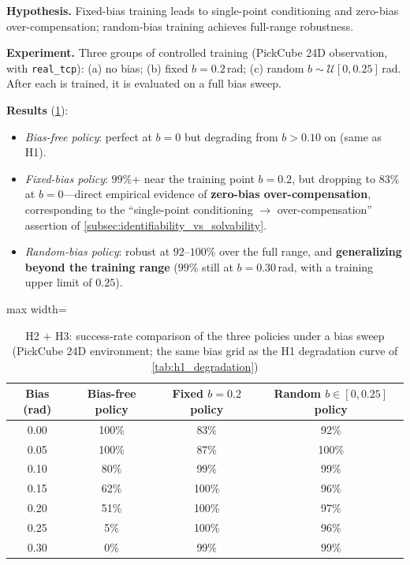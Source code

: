 \textbf{Hypothesis.} Fixed-bias training leads to single-point conditioning and zero-bias over-compensation; random-bias training achieves full-range robustness.

\textbf{Experiment.} Three groups of controlled training (PickCube 24D observation, with \texttt{real\_tcp}): (a) no bias; (b) fixed $b = 0.2$\,rad; (c) random $b \sim \mathcal{U}[0, 0.25]$\,rad. After each is trained, it is evaluated on a full bias sweep.

\textbf{Results} (\cref{tab:h2h3_three_strategies}):
\begin{itemize}
  \item \emph{Bias-free policy}: perfect at $b = 0$ but degrading from $b > 0.10$ on (same as H1).
  \item \emph{Fixed-bias policy}: $99\%$+ near the training point $b = 0.2$, but dropping to $83\%$ at $b = 0$---direct empirical evidence of \textbf{zero-bias over-compensation}, corresponding to the ``single-point conditioning $\to$ over-compensation'' assertion of \cref{subsec:identifiability_vs_solvability}.
  \item \emph{Random-bias policy}: robust at $92$--$100\%$ over the full range, and \textbf{generalizing beyond the training range} ($99\%$ still at $b = 0.30$\,rad, with a training upper limit of $0.25$).
\end{itemize}

\begin{table}[htbp]
  \centering
  \caption{H2 $+$ H3: success-rate comparison of the three policies under a bias sweep (PickCube 24D environment; the same bias grid as the H1 degradation curve of \cref{tab:h1_degradation})}
  \label{tab:h2h3_three_strategies}
  \footnotesize
  \begin{adjustbox}{max width=\textwidth}
  \begin{tabular}{@{}cccc@{}}
    \toprule
    Bias (rad) & Bias-free policy & Fixed $b=0.2$ policy & Random $b\in[0,0.25]$ policy \\
    \midrule
    0.00 & 100\% & 83\%   & 92\% \\
    0.05 & 100\% & 87\%   & 100\% \\
    0.10 & 80\%  & 99\%   & 99\% \\
    0.15 & 62\%  & 100\%  & 96\% \\
    0.20 & 51\%  & 100\%  & 97\% \\
    0.25 & 5\%   & 100\%  & 96\% \\
    0.30 & 0\%   & 99\%   & 99\% \\
    \bottomrule
  \end{tabular}
  \end{adjustbox}
\end{table}

